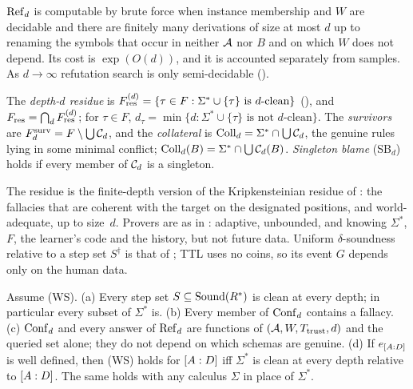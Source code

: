 $\mathrm{Ref}_d$ is computable by brute force when instance membership and $W$ are decidable and there are finitely many derivations of size at most $d$ up to renaming the symbols that occur in neither $\mathcal{A}$ nor $B$ and on which $W$ does not depend. Its cost is $\exp(O(d))$, and it is accounted separately from samples. As $d\to\infty$ refutation search is only semi-decidable ().

\begin{definition}\label{def:twotier:residue}
The \emph{depth-$d$ residue} is $F^{(d)}_{\mathrm{res}}=\{\tau\in F:\Sigma^*\cup\{\tau\}\text{ is $d$-clean}\}$ (), and $F_{\mathrm{res}}=\bigcap_dF^{(d)}_{\mathrm{res}}$; for $\tau\in F$, $d_\tau=\min\{d:\Sigma^*\cup\{\tau\}\text{ is not $d$-clean}\}$. The \emph{survivors} are $F^{\mathrm{surv}}_{d}=F\setminus\bigcup\mathcal{C}_d$, and the \emph{collateral} is $\mathrm{Coll}_d=\Sigma^*\cap\bigcup\mathcal{C}_d$, the genuine rules lying in some minimal conflict; $\mathrm{Coll}_d(B)=\Sigma^*\cap\bigcup\mathcal{C}_d(B)$. \emph{Singleton blame} (SB$_d$) holds if every member of $\mathcal{C}_d$ is a singleton.
\end{definition}

The residue is the finite-depth version of the Kripkensteinian residue of : the fallacies that are coherent with the target on the designated positions, and world-adequate, up to size~$d$. Provers are as in : adaptive, unbounded, and knowing $\Sigma^*$, $F$, the learner's code and the history, but not future data. Uniform $\delta$-soundness relative to a step set $S^\dagger$ is that of ; TTL uses no coins, so its event $G$ depends only on the human data.

\begin{lemma}\label{lem:twotier:onesided}
Assume (WS).
\textup{(a)} Every step set $S\subseteq\mathrm{Sound}(R^{*})$ is clean at every depth; in particular every subset of $\Sigma^*$ is.
\textup{(b)} Every member of $\mathrm{Conf}_d$ contains a fallacy.
\textup{(c)} $\mathrm{Conf}_d$ and every answer of $\mathrm{Ref}_d$ are functions of $(\mathcal{A},W,T_{\mathrm{trust}},d)$ and the queried set alone; they do not depend on which schemas are genuine.
\textup{(d)} If $e_{[A : D]}$ is well defined, then (WS) holds for $[A : D]$ iff $\Sigma^*$ is clean at every depth relative to $[A : D]$. The same holds with any calculus $\Sigma$ in place of $\Sigma^*$.
\end{lemma}

